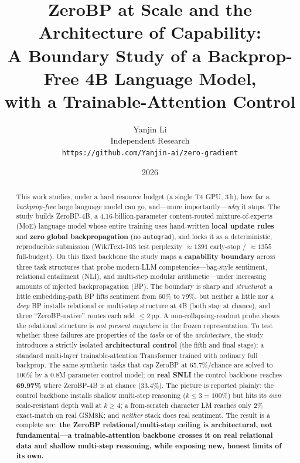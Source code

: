 \documentclass[11pt]{article}
\title{\bfseries ZeroBP at Scale and the Architecture of Capability:\\
A Boundary Study of a Backprop-Free 4B Language Model,\\ with a Trainable-Attention Control}
\author{Yanjin Li\\ \small Independent Research \\ \small \texttt{https://github.com/Yanjin-ai/zero-gradient}}
\date{2026}
\newcommand{\zbp}{ZeroBP-4B}
\begin{document}
\maketitle

\begin{abstract}
\noindent This work studies, under a hard resource budget (a single T4 GPU, 3\,h), how far a
\emph{backprop-free} large language model can go, and---more importantly---\emph{why} it stops. The study
builds \zbp{}, a 4.16-billion-parameter content-routed mixture-of-experts (MoE) language model whose
entire training uses hand-written \textbf{local update rules} and \textbf{zero global backpropagation}
(no \texttt{autograd}), and locks it as a deterministic, reproducible submission
(WikiText-103 test perplexity $\approx 1391$ early-stop / $\approx 1355$ full-budget). On this fixed
backbone the study maps a \textbf{capability boundary} across three task structures that probe modern-LLM
competencies---bag-style sentiment, relational entailment (NLI), and multi-step modular arithmetic---under
increasing amounts of injected backpropagation (BP). The boundary is sharp and \emph{structural}: a little
embedding-path BP lifts sentiment from 60\% to 79\%, but neither a little nor a \emph{deep} BP installs
relational or multi-step structure at 4B (both stay at chance), and three ``ZeroBP-native'' routes each add
$\le 2$\,pp. A non-collapsing-readout probe shows the relational structure is \emph{not present anywhere} in
the frozen representation. To test whether these failures are properties of the \emph{tasks} or of the
\emph{architecture}, the study introduces a strictly isolated \textbf{architectural control} (the fifth and
final stage): a standard multi-layer trainable-attention Transformer trained with ordinary full backprop.
The same synthetic tasks that cap ZeroBP at 65.7\%/chance are solved to 100\% by a 0.8M-parameter control
model; on \textbf{real SNLI} the control backbone reaches \textbf{69.97\%} where \zbp{} is at chance
(33.4\%). The picture is reported plainly: the control backbone installs shallow multi-step reasoning
($k \le 3 = 100\%$) but hits its \emph{own} scale-resistant depth wall at $k \ge 4$; a from-scratch
character LM reaches only 2\% exact-match on real GSM8K; and \emph{neither} stack does real sentiment.
The result is a complete arc: \textbf{the ZeroBP relational/multi-step ceiling is architectural, not
fundamental---a trainable-attention backbone crosses it on real relational data and shallow multi-step
reasoning, while exposing new, honest limits of its own.}
\end{abstract}
\end{document}
